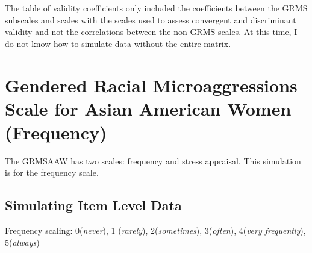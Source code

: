 \documentclass[
  english,
]{book}
\begin{document}
The table of validity coefficients only included the coefficients between the GRMS subscales and scales with the scales used to assess convergent and discriminant validity and not the correlations between the non-GRMS scales. At this time, I do not know how to simulate data without the entire matrix.

\hypertarget{gendered-racial-microaggressions-scale-for-asian-american-women-frequency}{%
\section{Gendered Racial Microaggressions Scale for Asian American Women (Frequency)}\label{gendered-racial-microaggressions-scale-for-asian-american-women-frequency}}

The GRMSAAW has two scales: frequency and stress appraisal. This simulation is for the frequency scale.

\hypertarget{simulating-item-level-data-4}{%
\subsection{Simulating Item Level Data}\label{simulating-item-level-data-4}}

Frequency scaling: 0(\emph{never}), 1 (\emph{rarely}), 2(\emph{sometimes}), 3(\emph{often}), 4(\emph{very frequently}), 5(\emph{always})
\end{document}
